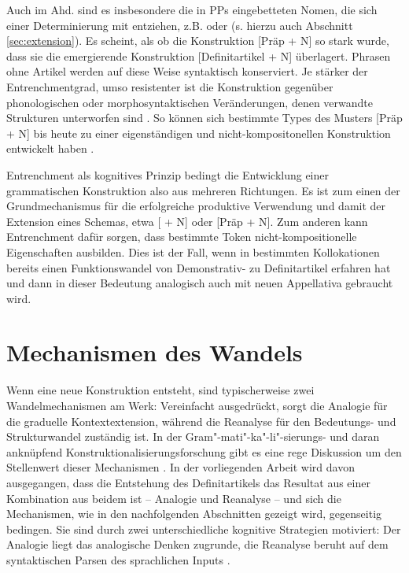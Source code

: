 Auch im Ahd. sind es insbesondere die in PPs eingebetteten Nomen, die sich einer Determinierung mit  entziehen, z.B.   oder   \parencite[84]{Oubouzar1992} (s. hierzu auch Abschnitt \ref{sec:extension}). Es scheint, als ob die Konstruktion [Präp + N] so stark  wurde, dass sie die emergierende Konstruktion [Definitartikel + N] überlagert. Phrasen ohne Artikel werden auf diese Weise syntaktisch konserviert. Je stärker der Entrenchmentgrad, umso resistenter ist die Konstruktion gegenüber phonologischen oder morphosyntaktischen Veränderungen, denen verwandte Strukturen unterworfen sind \parencite[715]{Bybee2006}. So können sich bestimmte Types des Musters [Präp + N] bis heute zu einer eigenständigen und nicht-kompositonellen Konstruktion entwickelt haben \parencite[343f.]{Himmelmann1998}. 

Entrenchment als kognitives Prinzip bedingt die Entwicklung einer grammatischen Konstruktion also aus mehreren Richtungen. Es ist zum einen der Grundmechanismus für die erfolgreiche produktive Verwendung und damit der Extension eines Schemas, etwa [ + N] oder [Präp + N]. Zum anderen kann Entrenchment dafür sorgen, dass bestimmte Token nicht-kompositionelle Eigenschaften ausbilden. Dies ist der Fall, wenn  in bestimmten Kollokationen bereits einen Funktionswandel von Demonstrativ- zu Definitartikel erfahren hat und dann in dieser Bedeutung analogisch auch mit neuen Appellativa gebraucht wird. 


\section{Mechanismen des Wandels}\label{sec:mechanismen}

Wenn eine neue Konstruktion entsteht, sind typischerweise zwei Wandelmechanismen am Werk: Vereinfacht ausgedrückt, sorgt die Analogie für die graduelle Kontextextension, während die Reanalyse für den Bedeutungs- und Strukturwandel zuständig ist. In der Gram"-mati"-ka"-li"-sierungs- und daran anknüpfend  Konstruktionalisierungsforschung gibt es eine rege Diskussion um den Stellenwert dieser Mechanismen \parencite[vgl. u.a.][]{Haspelmath1998,Lehmann2004,Fischer2007}. In der vorliegenden Arbeit wird davon ausgegangen, dass die Entstehung des Definitartikels das Resultat aus einer Kombination aus beidem ist --  Analogie und Reanalyse -- und sich die Mechanismen, wie in den nachfolgenden Abschnitten gezeigt wird, gegenseitig bedingen. Sie sind durch zwei unterschiedliche kognitive Strategien motiviert: Der Analogie liegt das analogische Denken zugrunde, die Reanalyse beruht auf dem syntaktischen Parsen des sprachlichen Inputs \parencite[38]{Traugott2013}.  


